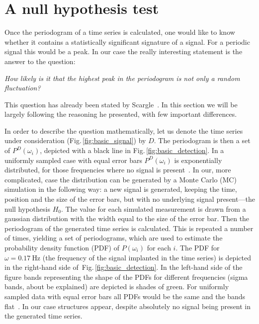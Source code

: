 \section{A null hypothesis test}
\label{sec:a_null_hypothesis_test}
Once the periodogram of a time series is calculated, one would like to know whether it contains a statistically significant signature of a signal. For a periodic signal this would be a peak. In our case the really interesting statement is the answer to the question:
\begin{center}
  \emph{How likely is it that the highest peak in the periodogram is not only a random fluctuation?}
\end{center}
This question has already been stated by Scargle~\cite{Scargle1982}. In this section we will be largely following the reasoning he presented, with few important differences.

In order to describe the question mathematically, let us denote the time series under consideration (Fig.\,\ref{fig:basic_signal}) by $D$. The periodogram is then a set of $P^D(\omega_i)$, depicted with a black line in Fig.\,\ref{fig:basic_detection}.
In a uniformly sampled case with equal error bars $P^D(\omega_i)$ is exponentially distributed, for those frequencies where no signal is present~\cite{Scargle1982}. In our, more complicated, case the distribution can be generated by a Monte Carlo (MC) simulation in the following way: a new signal is generated, keeping the time, position and the size of the error bars, but with no underlying signal present---the null hypothesis $H_0$.
The value for each simulated measurement is drawn from a gaussian distribution with the width equal to the size of the error bar. Then the periodogram of the generated time series is calculated. This is repeated a number of times, yielding a set of periodograms, which are used to estimate the probability density function (PDF) of $P(\omega_i)$ for each $i$. The PDF for $\omega = \SI{0.17}{\hertz}$ (the frequency of the signal implanted in the time series) is depicted in the right-hand side of~Fig.\,\ref{fig:basic_detection}.
In the left-hand side of the figure bands representing the shape of the PDFs for different frequencies (sigma bands, about be explained) are depicted is shades of green.
For uniformly sampled data with equal error bars all PDFs would be the same and the bands flat~\cite{Scargle1982}. In our case structures appear, despite absolutely no signal being present in the generated time series.

